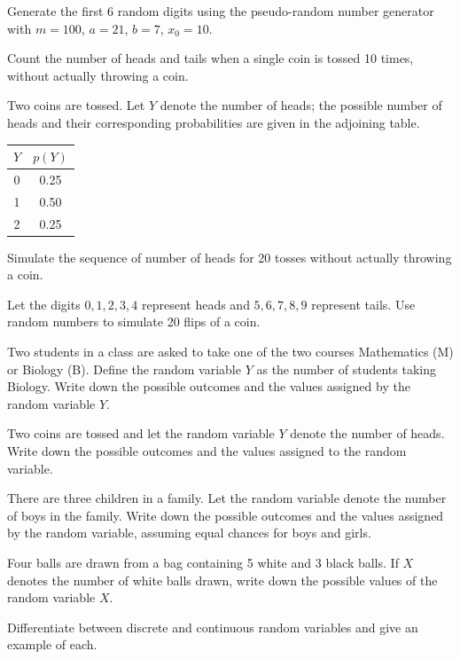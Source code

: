 \documentclass[11pt,a4paper]{article}
\begin{document}
\begin{longlist}
\item Generate the first 6 random digits using the pseudo-random number generator with $m=100$, $a=21$, $b=7$, $x_0=10$.

\item Count the number of heads and tails when a single coin is tossed 10 times, without actually throwing a coin.

\item Two coins are tossed. Let $Y$ denote the number of heads; the possible number of heads and their corresponding probabilities are given in the adjoining table.
\begin{center}
\begin{tabular}{cc}
\toprule
$Y$ & $p(Y)$ \\
\midrule
0 & 0.25 \\
1 & 0.50 \\
2 & 0.25 \\
\bottomrule
\end{tabular}
\end{center}
Simulate the sequence of number of heads for 20 tosses without actually throwing a coin.

\item Let the digits $0,1,2,3,4$ represent heads and $5,6,7,8,9$ represent tails. Use random numbers to simulate 20 flips of a coin.

\item Two students in a class are asked to take one of the two courses Mathematics (M) or Biology (B). Define the random variable $Y$ as the number of students taking Biology. Write down the possible outcomes and the values assigned by the random variable $Y$.

\item Two coins are tossed and let the random variable $Y$ denote the number of heads. Write down the possible outcomes and the values assigned to the random variable.

\item There are three children in a family. Let the random variable denote the number of boys in the family. Write down the possible outcomes and the values assigned by the random variable, assuming equal chances for boys and girls.

\item Four balls are drawn from a bag containing 5 white and 3 black balls. If $X$ denotes the number of white balls drawn, write down the possible values of the random variable $X$.

\item Differentiate between discrete and continuous random variables and give an example of each.


\end{longlist}
\end{document}
